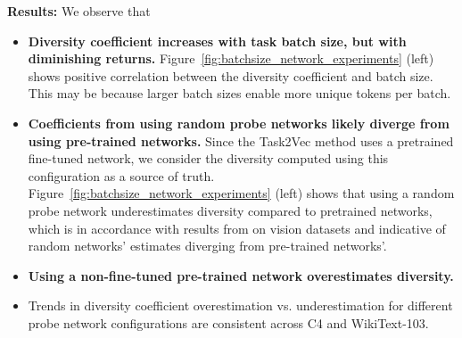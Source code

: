 \textbf{Results:} We observe that
\begin{itemize} %
    \item \textbf{Diversity coefficient increases with task batch size, but with diminishing returns.} 
    Figure~\ref{fig:batchsize_network_experiments} (left) shows positive correlation between the diversity coefficient and batch size. 
    This may be because larger batch sizes enable more unique tokens per batch.
    \item \textbf{Coefficients from using random probe networks likely diverge from using pre-trained networks.} 
    Since the Task2Vec method \citep{task2vec} uses a pretrained fine-tuned network, we consider the diversity computed using this configuration as a source of truth. 
    Figure~\ref{fig:batchsize_network_experiments} (left) shows that using a random probe network underestimates diversity compared to pretrained networks, which is in accordance with results from \citep{diversity} on vision datasets and indicative of random networks' estimates diverging from pre-trained networks'. 
    \item \textbf{Using a non-fine-tuned pre-trained network overestimates diversity.} 
    \item Trends in diversity coefficient overestimation vs. underestimation for different probe network configurations are consistent across C4 and WikiText-103.
\end{itemize}

